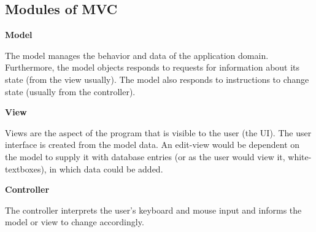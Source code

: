 \subsection{Modules of MVC}

\noindent
\textbf{Model}

\noindent
The model manages the behavior and data of the application domain\cite{modelviewcontroller}. Furthermore, the model objects responds to requests for information about its state (from the view usually)\cite{modelviewcontroller}. The model also responds to instructions to change state (usually from the controller)\cite{modelviewcontroller}.

\vspace{5 mm}
\noindent
\textbf{View}

\noindent
Views are the aspect of the program that is visible to the user (the UI)\cite{mvcasp}. The user interface is created from the model data\cite{mvcasp}. An edit-view would be dependent on the model to supply it with database entries (or as the user would view it, white-textboxes), in which data could be added. 

\vspace{5 mm}
\noindent
\textbf{Controller}

\noindent
The controller interprets the user's keyboard and mouse input and informs the model or view to change accordingly\cite{mvcasp}.